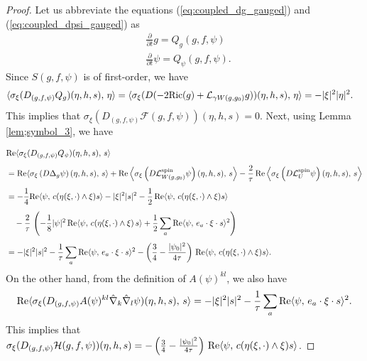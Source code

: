 \documentclass{amsart}
\theoremstyle{definition}
\theoremstyle{remark}
\numberwithin{equation}{section}
\newcommand{\Ric}{\textup{Ric}}
\begin{document}
\begin{proof}
	Let us abbreviate the equations (\ref{eq:coupled_dg_gauged}) and (\ref{eq:coupled_dpsi_gauged}) as
\begin{equation}\label{gauged;system}
	\begin{aligned}
		&\frac{\partial}{\partial t}g =  Q_g(g,f,\psi)\\[1ex]
		&\frac{\partial}{\partial t}\psi =  Q_{\psi}(g,f,\psi).
	\end{aligned}
\end{equation}
Since $S(g,f,\psi)$ is of first-order, we have
\begin{align*}
	\langle\sigma_{\xi}(D_{(g,f,\psi)}Q_g)(\eta,h,  s),\,\eta\rangle
	&=	\langle \sigma_{\xi}(D(-2\Ric(g) + \mathcal{L}_{\gamma W(g,g_0)}g))(\eta, h, s),\,\eta\rangle = -|\xi|^2 |\eta|^2.
	\end{align*}
This implies that $\sigma_{\xi}(D_{(g,f,\psi)}\mathcal{F}(g,f,\psi))(\eta,h,  s) = 0$.
Next, using Lemma \ref{lem;symbol_3}, we have

	\begin{align*}
		&\textup{Re}\langle \sigma_{\xi}(D_{(g,f,\psi)}Q_{\psi})(\eta,h, s),\, s\rangle\\[1ex]
		&= \textup{Re}\langle \sigma_{\xi}\left( D\Delta_g\psi \right)(\eta,h,s),\, s\rangle +  \textup{Re}\left\langle\sigma_{\xi}\left( D\mathcal{L}_{W(g,g_0)}^{\text{spin}}\psi \right)(\eta,h,s),\, s \right\rangle  -\frac{2}{\tau}\, \textup{Re}\left\langle \sigma_{\xi}\left(  D \mathcal{L}_{U}^{\text{spin}}\psi \right)(\eta,h,s),\,s \right\rangle\\[1ex]
		&=  -\frac{1}{4}\textup{Re}\langle \psi,\, c( \eta(\xi,\cdot)\wedge\xi) s\rangle - |\xi|^2 |s|^2 -\frac{1}{2}\,\textup{Re}\langle  \psi,\,c(\eta(\xi,\cdot)\wedge\xi) s\rangle \\[1ex]
		&\quad -\frac{2}{\tau}\, \left( -\frac{1}{8} |\psi|^2\,  \textup{Re}\langle \psi,\, c(\eta(\xi,\cdot)\wedge \xi)\, s\rangle + \frac{1}{2}  \sum_a\textup{Re} \langle\psi,\, e_a\cdot \xi\cdot s\rangle^2\right)\\[1ex]
		&= -   |\xi|^2 |s|^2 -\frac{1}{\tau}\sum_a \textup{Re}\langle\psi,\, e_a\cdot \xi\cdot s\rangle^2 - \left(\frac{3}{4}  - \frac{|\psi_0|^2}{4\tau}\right)\,\textup{Re}\langle  \psi,\,c(\eta(\xi,\cdot)\wedge\xi) s\rangle.
	\end{align*}
On the other hand, from the definition of $A(\psi)^{kl}$, we also have
\begin{align*}
	\textup{Re}\langle \sigma_{\xi}(D_{(g,f,\psi)}A(\psi)^{kl}\hat{\nabla}_k\hat{\nabla}_l\psi)(\eta,h, s),\, s\rangle= -   |\xi|^2 |s|^2 -\frac{1}{\tau}\sum_a \textup{Re}\langle\psi,\, e_a\cdot \xi\cdot s\rangle^2.
\end{align*}
This implies that $\sigma_{\xi}(D_{(g,f,\psi)}\mathcal{H}(g,f,\psi))(\eta,h, s) =  - \left(\frac{3}{4}  - \frac{|\psi_0|^2}{4\tau}\right)\,\textup{Re}\langle  \psi,\,c(\eta(\xi,\cdot)\wedge\xi) s\rangle$.
\end{proof}
\end{document}
